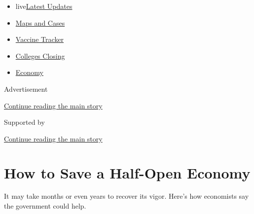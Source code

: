 \begin{itemize}
\tightlist
\item
  live\href{https://www.nytimes3xbfgragh.onion/2020/08/21/world/covid-19-coronavirus.html?name=styln-coronavirus-markets\&region=TOP_BANNER\&variant=undefined\&block=storyline_menu_recirc\&action=click\&pgtype=Article\&impression_id=118ead10-e3aa-11ea-98f9-47cef13f5a6f}{Latest
  Updates}
\item
  \href{https://www.nytimes3xbfgragh.onion/interactive/2020/us/coronavirus-us-cases.html?name=styln-coronavirus-markets\&region=TOP_BANNER\&variant=undefined\&block=storyline_menu_recirc\&action=click\&pgtype=Article\&impression_id=118ead11-e3aa-11ea-98f9-47cef13f5a6f}{Maps
  and Cases}
\item
  \href{https://www.nytimes3xbfgragh.onion/interactive/2020/science/coronavirus-vaccine-tracker.html?name=styln-coronavirus-markets\&region=TOP_BANNER\&variant=undefined\&block=storyline_menu_recirc\&action=click\&pgtype=Article\&impression_id=118ead12-e3aa-11ea-98f9-47cef13f5a6f}{Vaccine
  Tracker}
\item
  \href{https://www.nytimes3xbfgragh.onion/2020/08/19/us/colleges-closing-covid.html?name=styln-coronavirus-markets\&region=TOP_BANNER\&variant=undefined\&block=storyline_menu_recirc\&action=click\&pgtype=Article\&impression_id=118ead13-e3aa-11ea-98f9-47cef13f5a6f}{Colleges
  Closing}
\item
  \href{https://www.nytimes3xbfgragh.onion/live/2020/08/21/business/stock-market-today-coronavirus?name=styln-coronavirus-markets\&region=TOP_BANNER\&variant=undefined\&block=storyline_menu_recirc\&action=click\&pgtype=Article\&impression_id=118ead14-e3aa-11ea-98f9-47cef13f5a6f}{Economy}
\end{itemize}

Advertisement

\protect\hyperlink{after-top}{Continue reading the main story}

Supported by

\protect\hyperlink{after-sponsor}{Continue reading the main story}

\hypertarget{how-to-save-a-half-open-economy}{%
\section{How to Save a Half-Open
Economy}\label{how-to-save-a-half-open-economy}}

It may take months or even years to recover its vigor. Here's how
economists say the government could help.

